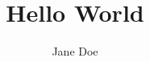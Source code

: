 \documentclass{article}
\begin{document}
\title{Hello World}
\author{Jane Doe}
\maketitle
\end{document}
